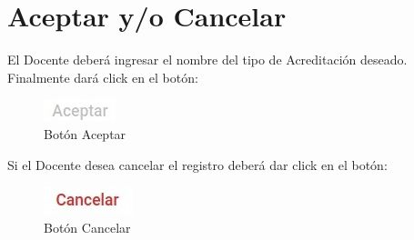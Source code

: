 \pagebreak
\hypertarget{AceptarCancelar}{\section{Aceptar y/o Cancelar}}
El Docente deberá ingresar el nombre del tipo de Acreditación deseado. Finalmente dará click en el botón: 

\begin{figure}[!hbtp]
    \centering
    \includegraphics[width=0.1\linewidth]{images/SP6/BotonAceptar.jpeg}
    \caption{Botón Aceptar} 
\end{figure}

Si el Docente desea cancelar el registro deberá dar click en el botón: 

\begin{figure}[!hbtp]
    \centering
    \includegraphics[width=0.1\linewidth]{images/SP6/BotonCancelar.jpeg}
    \caption{Botón Cancelar} 
\end{figure}